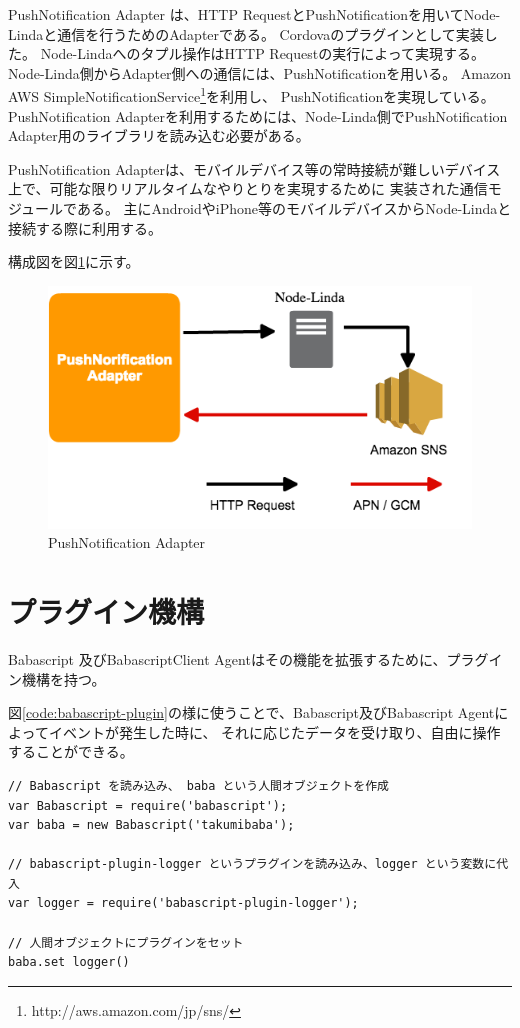 PushNotification Adapter は、HTTP
RequestとPushNotificationを用いてNode-Lindaと通信を行うためのAdapterである。
Cordovaのプラグインとして実装した。 Node-Lindaへのタプル操作はHTTP
Requestの実行によって実現する。
Node-Linda側からAdapter側への通信には、PushNotificationを用いる。 Amazon
AWS
SimpleNotificationService\footnote{http://aws.amazon.com/jp/sns/}を利用し、
PushNotificationを実現している。 PushNotification
Adapterを利用するためには、Node-Linda側でPushNotification
Adapter用のライブラリを読み込む必要がある。

PushNotification
Adapterは、モバイルデバイス等の常時接続が難しいデバイス上で、可能な限りリアルタイムなやりとりを実現するために
実装された通信モジュールである。
主にAndroidやiPhone等のモバイルデバイスからNode-Lindaと接続する際に利用する。

構成図を図\ref{fig:push-notification-adapter}に示す。

\begin{figure}[htbp]
  \begin{center}
  \includegraphics[width=.5\linewidth,bb=0 0 529 303]{images/push-notification-adapter.png}
  \end{center}
  \caption{PushNotification Adapter}
  \label{fig:push-notification-adapter}
\end{figure}

\section{プラグイン機構}\label{ux30d7ux30e9ux30b0ux30a4ux30f3ux6a5fux69cb}

Babascript 及びBabascriptClient
Agentはその機能を拡張するために、プラグイン機構を持つ。

図\ref{code:babascript-plugin}の様に使うことで、Babascript及びBabascript
Agentによってイベントが発生した時に、
それに応じたデータを受け取り、自由に操作することができる。

\begin{lstlisting}[caption=Babascript Plugin, label=code:babascript-plugin]
// Babascript を読み込み、 baba という人間オブジェクトを作成
var Babascript = require('babascript');
var baba = new Babascript('takumibaba');

// babascript-plugin-logger というプラグインを読み込み、logger という変数に代入
var logger = require('babascript-plugin-logger');

// 人間オブジェクトにプラグインをセット
baba.set logger()
\end{lstlisting}

